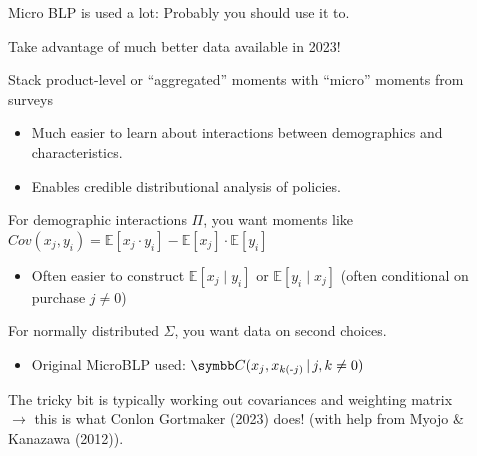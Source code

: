 \documentclass[aspectratio=169,10pt]{beamer}
\begin{document}
\begin{frame}{Micro BLP is used a lot: Probably you should use it to.}
    \begin{wideitemize}
        \item Take advantage of much better data available in 2023!
        \item Stack product-level or ``\alert{aggregated}'' moments with ``\alert{micro}'' moments from surveys
        \begin{itemize}
            \item Much easier to learn about interactions between demographics and characteristics.
            \item Enables credible \alert{distributional analysis} of policies.
        \end{itemize}
        \item For demographic interactions $\Pi$, you want moments like $Cov(x_j, y_i) = \mathbb{E}[x_j \cdot y_i] -\mathbb{E}[x_j] \cdot \mathbb{E}[y_i]$
        \begin{itemize}
            \item Often easier to construct $\mathbb{E}[x_j \mid y_i]$ or $\mathbb{E}[y_i \mid x_j]$ (often conditional on purchase $j \neq 0$)
        \end{itemize}
        \item For normally distributed $\Sigma$, you want \alert{data on second choices}.
        \begin{itemize}
            \item Original MicroBLP used: $\Cov(x_j, x_{k(\text{-}j)} \,|\, j, k \neq 0)$
        \end{itemize}
        \item The tricky bit is typically working out covariances and weighting matrix\\ $\rightarrow$ this is what Conlon Gortmaker (2023) does! (with help from Myojo \& Kanazawa (2012)).
    \end{wideitemize}
\end{frame}
\end{document}
